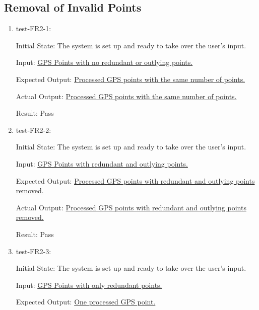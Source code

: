 \documentclass[12pt, titlepage]{article}
\begin{document}
\subsection{Removal of Invalid Points}
\begin{enumerate}
    \item test-FR2-1:\label{test-FR2-1}
    
    Initial State: The system is set up and ready to take over the user’s input.
    
    Input: \href{https://github.com/paezha/PyERT-BLACK/blob/rev0-test/test/test_data/fr-tests/fr2-1-in.csv}{GPS Points with no redundant or outlying points.}
    
    Expected Output: \href{https://github.com/paezha/PyERT-BLACK/blob/rev0-test/test/test_data/fr-tests/fr2-1-expected.csv}{Processed GPS points with the same number of points.}
    
    Actual Output: \href{https://github.com/paezha/PyERT-BLACK/blob/rev0-test/test/test_data/fr-tests/fr2-1-out.csv}{Processed GPS points with the same number of points.}
    
    Result: Pass
    \item test-FR2-2:\label{test-FR2-2}
    
    Initial State: The system is set up and ready to take over the user’s input.
    
    Input: \href{https://github.com/paezha/PyERT-BLACK/blob/rev0-test/test/test_data/fr-tests/fr2-2-in.csv}{GPS Points with redundant and outlying points.}
    
    Expected Output: \href{https://github.com/paezha/PyERT-BLACK/blob/rev0-test/test/test_data/fr-tests/fr2-2-expected.csv}{Processed GPS points with redundant and outlying points removed.}
    
    Actual Output: \href{https://github.com/paezha/PyERT-BLACK/blob/rev0-test/test/test_data/fr-tests/fr2-2-out.csv}{Processed GPS points with redundant and outlying points removed.}
    
    Result: Pass
    \item test-FR2-3:\label{test-FR2-3}
    
    Initial State: The system is set up and ready to take over the user’s input.
    
    Input: \href{https://github.com/paezha/PyERT-BLACK/blob/rev0-test/test/test_data/fr-tests/fr2-3-in.csv}{GPS Points with only redundant points.}
    
    Expected Output: \href{https://github.com/paezha/PyERT-BLACK/blob/rev0-test/test/test_data/fr-tests/fr2-3-expected.csv}{One processed GPS point.}
    

\end{enumerate}
\end{document}
